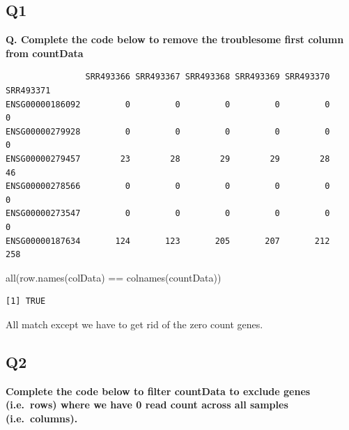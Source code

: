 \documentclass[
  letterpaper,
  DIV=11,
  numbers=noendperiod]{scrartcl}
\newenvironment{Shaded}{\begin{snugshade}}{\end{snugshade}}
\newcommand{\CommentTok}[1]{\textcolor[rgb]{0.37,0.37,0.37}{#1}}
\newcommand{\DecValTok}[1]{\textcolor[rgb]{0.68,0.00,0.00}{#1}}
\newcommand{\FunctionTok}[1]{\textcolor[rgb]{0.28,0.35,0.67}{#1}}
\newcommand{\NormalTok}[1]{\textcolor[rgb]{0.00,0.23,0.31}{#1}}
\newcommand{\OtherTok}[1]{\textcolor[rgb]{0.00,0.23,0.31}{#1}}
\newcommand{\SpecialCharTok}[1]{\textcolor[rgb]{0.37,0.37,0.37}{#1}}
\begin{document}
\hypertarget{q1}{%
\subsection{\texorpdfstring{\textbf{Q1}}{Q1}}\label{q1}}

\textbf{Q. Complete the code below to remove the troublesome first
column from countData}

\begin{Shaded}
\end{Shaded}

\begin{verbatim}
                SRR493366 SRR493367 SRR493368 SRR493369 SRR493370 SRR493371
ENSG00000186092         0         0         0         0         0         0
ENSG00000279928         0         0         0         0         0         0
ENSG00000279457        23        28        29        29        28        46
ENSG00000278566         0         0         0         0         0         0
ENSG00000273547         0         0         0         0         0         0
ENSG00000187634       124       123       205       207       212       258
\end{verbatim}

\begin{Shaded}
\begin{Highlighting}[]
\FunctionTok{all}\NormalTok{(}\FunctionTok{row.names}\NormalTok{(colData) }\SpecialCharTok{==} \FunctionTok{colnames}\NormalTok{(countData))}
\end{Highlighting}
\end{Shaded}

\begin{verbatim}
[1] TRUE
\end{verbatim}

All match except we have to get rid of the zero count genes.

\hypertarget{q2}{%
\subsection{\texorpdfstring{\textbf{Q2}}{Q2}}\label{q2}}

\textbf{Complete the code below to filter countData to exclude genes
(i.e.~rows) where we have 0 read count across all samples
(i.e.~columns).}
\end{document}
